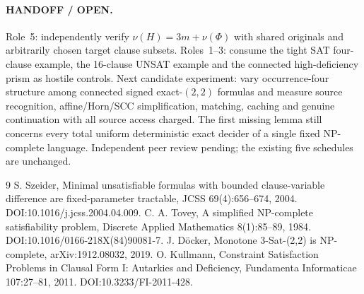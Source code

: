 \documentclass[11pt]{article}
\begin{document}
\paragraph{HANDOFF / OPEN.}
Role~5: independently verify $\nu(H)=3m+\nu(\Phi)$ with shared originals and arbitrarily chosen target clause subsets. Roles~1--3: consume the tight SAT four-clause example, the 16-clause UNSAT example and the connected high-deficiency prism as hostile controls. Next candidate experiment: vary occurrence-four structure among connected signed exact-$(2,2)$ formulas and measure source recognition, affine/Horn/SCC simplification, matching, caching and genuine continuation with all source access charged. The first missing lemma still concerns every total uniform deterministic exact decider of a single fixed NP-complete language. Independent peer review pending; the existing five schedules are unchanged.

\begin{thebibliography}{9}
 S. Szeider, Minimal unsatisfiable formulas with bounded clause-variable difference are fixed-parameter tractable, JCSS 69(4):656--674, 2004. DOI:10.1016/j.jcss.2004.04.009.
 C. A. Tovey, A simplified NP-complete satisfiability problem, Discrete Applied Mathematics 8(1):85--89, 1984. DOI:10.1016/0166-218X(84)90081-7.
 J. D\"ocker, Monotone 3-Sat-(2,2) is NP-complete, arXiv:1912.08032, 2019.
 O. Kullmann, Constraint Satisfaction Problems in Clausal Form I: Autarkies and Deficiency, Fundamenta Informaticae 107:27--81, 2011. DOI:10.3233/FI-2011-428.
\end{thebibliography}
\end{document}

